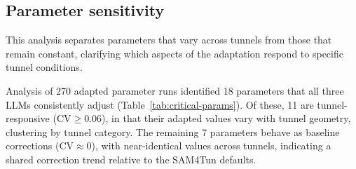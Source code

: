 \documentclass[a4paper,fleqn]{cas-dc}
\begin{document}
{\subsection{Parameter sensitivity}\label{sec:sensitivity}

This analysis separates parameters that vary across tunnels from those that remain constant, clarifying which aspects of the adaptation respond to specific tunnel conditions.

Analysis of 270 adapted parameter runs identified 18 parameters that all three LLMs consistently adjust (Table~\ref{tab:critical-params}). Of these, 11 are tunnel-responsive ($\text{CV} \geq 0.06$), in that their adapted values vary with tunnel geometry, clustering by tunnel category. The remaining 7 parameters behave as baseline corrections ($\text{CV} \approx 0$), with near-identical values across tunnels, indicating a shared correction trend relative to the SAM4Tun defaults.

}
\end{document}

